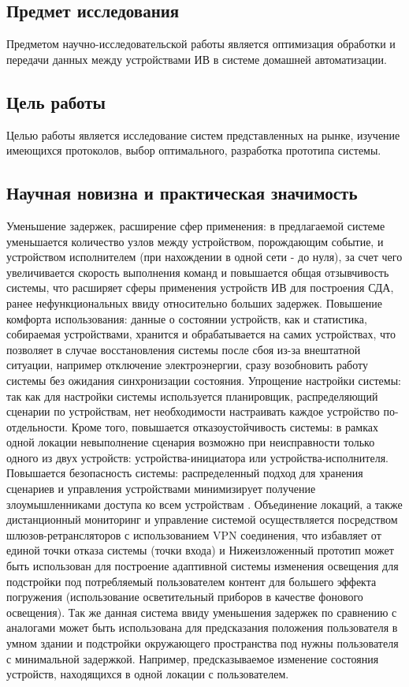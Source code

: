 \documentclass[a4paper,12pt]{article}
\begin{document}
\subsection{Предмет исследования}
Предметом научно-исследовательской работы является оптимизация обработки и передачи данных между устройствами ИВ в системе домашней автоматизации.

\subsection{Цель работы}
Целью работы является исследование систем представленных на рынке, изучение имеющихся протоколов, выбор оптимального, разработка прототипа системы.

\subsection{Научная новизна и практическая значимость}
Уменьшение задержек, расширение сфер применения: в предлагаемой системе уменьшается количество узлов между устройством, порождающим событие, и устройством исполнителем (при нахождении в одной сети - до нуля), за счет чего увеличивается скорость выполнения команд и повышается общая отзывчивость системы, что расширяет сферы применения устройств ИВ для построения СДА, ранее нефункциональных ввиду относительно больших задержек.
Повышение комфорта использования: данные о состоянии устройств, как и статистика, собираемая устройствами, хранится и обрабатывается на самих устройствах, что позволяет в случае восстановления системы после сбоя из-за внештатной ситуации, например отключение электроэнергии, сразу возобновить работу системы без ожидания синхронизации состояния.
Упрощение настройки системы: так как для настройки системы используется планировщик, распределяющий сценарии по устройствам, нет необходимости настраивать каждое устройство по-отдельности.
Кроме того, повышается отказоустойчивость системы: в рамках одной локации невыполнение сценария возможно при неисправности только одного из двух устройств: устройства-инициатора или устройства-исполнителя.
Повышается безопасность системы: распределенный подход для хранения сценариев и управления устройствами минимизирует получение злоумышленниками доступа ко всем устройствам . Объединение локаций, а также дистанционный мониторинг и управление системой осуществляется посредством шлюзов-ретрансляторов с использованием VPN соединения, что избавляет от единой точки отказа системы (точки входа) и 
Нижеизложенный прототип может быть использован для построение адаптивной системы изменения освещения для подстройки под потребляемый пользователем контент для большего эффекта погружения (использование осветительный приборов в качестве фонового освещения). Так же данная система ввиду уменьшения задержек по сравнению с аналогами может быть использована для предсказания положения пользователя в умном здании и подстройки окружающего пространства под нужны пользователя с минимальной задержкой. Например, предсказываемое изменение состояния устройств, находящихся в одной локации с пользователем.
\end{document}

